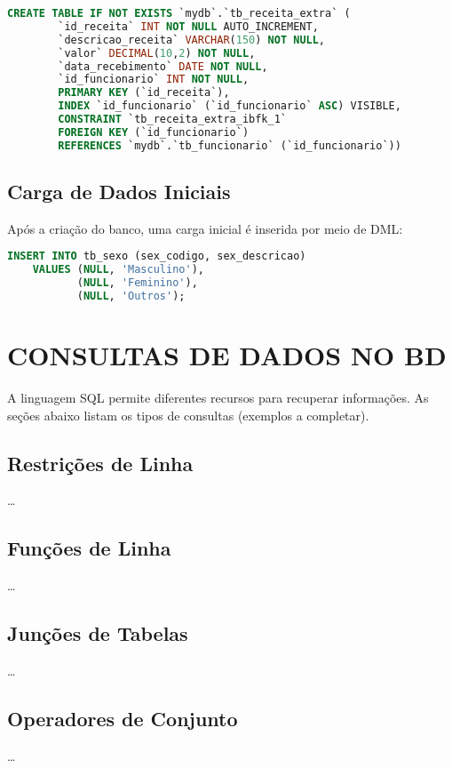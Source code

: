 \documentclass[
12pt,
a4paper,
semrecuonosumario,
sumario = abnt-6027-2012]{report}
\begin{document}
    \begin{lstlisting}[language=SQL,caption={DDL -- Tabela \texttt{tb\_receita\_extra}}]
    	CREATE TABLE IF NOT EXISTS `mydb`.`tb_receita_extra` (
    	`id_receita` INT NOT NULL AUTO_INCREMENT,
    	`descricao_receita` VARCHAR(150) NOT NULL,
    	`valor` DECIMAL(10,2) NOT NULL,
    	`data_recebimento` DATE NOT NULL,
    	`id_funcionario` INT NOT NULL,
    	PRIMARY KEY (`id_receita`),
    	INDEX `id_funcionario` (`id_funcionario` ASC) VISIBLE,
    	CONSTRAINT `tb_receita_extra_ibfk_1`
    	FOREIGN KEY (`id_funcionario`)
    	REFERENCES `mydb`.`tb_funcionario` (`id_funcionario`))
    \end{lstlisting}
    

    \section{Carga de Dados Iniciais}\label{sec:carga}
    Após a criação do banco, uma carga inicial é inserida por meio de DML:
    
    \begin{lstlisting}[language=SQL,caption={DML -- Carga inicial na tabela \texttt{tb\_sexo}}]
    INSERT INTO tb_sexo (sex_codigo, sex_descricao)
    VALUES (NULL, 'Masculino'),
           (NULL, 'Feminino'),
           (NULL, 'Outros');
    \end{lstlisting}

\chapter{CONSULTAS DE DADOS NO BD}\label{chap:consultas}
A linguagem SQL permite diferentes recursos para recuperar informações.
As seções abaixo listam os tipos de consultas (exemplos a completar).
    
    \section{Restrições de Linha}
    \dots
    
    \section{Funções de Linha}
    \dots
    
    \section{Junções de Tabelas}
    \dots
    
    \section{Operadores de Conjunto}
    \dots
    
\end{document}
